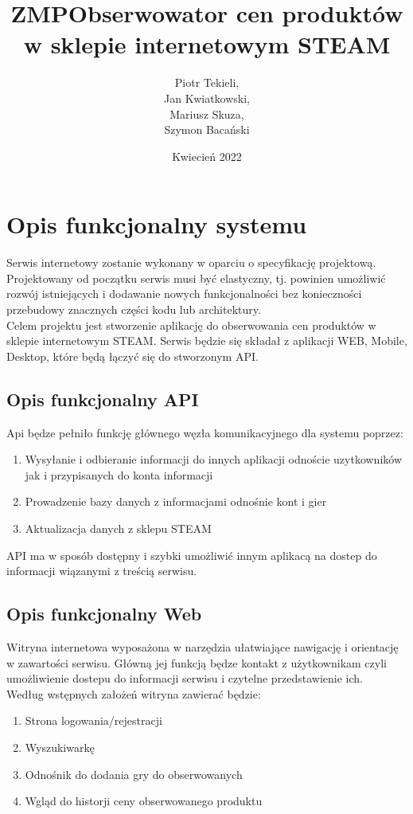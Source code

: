 \documentclass{article}
\title{ZMP\textunderscore Obserwowator cen produktów w sklepie  internetowym STEAM}
\author{
Piotr Tekieli,\\
Jan Kwiatkowski,\\
Mariusz Skuza,\\
Szymon Bacański
}
\date{Kwiecień 2022}
\begin{document}
\maketitle

\section{Opis funkcjonalny systemu}
Serwis internetowy zostanie wykonany w oparciu o specyfikację projektową. Projektowany od początku serwis musi być elastyczny, tj. powinien umożliwić rozwój istniejących i dodawanie nowych funkcjonalności bez konieczności przebudowy znacznych części kodu lub architektury.
\\
Celem projektu jest stworzenie aplikację do obserwowania cen produktów w sklepie internetowym STEAM. Serwis będzie się składał z aplikacji WEB, Mobile, Desktop, które będą łączyć się do stworzonym API.

    \subsection{Opis funkcjonalny API}
        Api będze pełniło funkcję głównego węzła komunikacyjnego dla systemu poprzez:
        \begin{enumerate}
            \item Wysyłanie i odbieranie informacji do innych aplikacji odnoście uzytkowników jak i przypisanych do konta informacji
            \item Prowadzenie bazy danych z informacjami odnośnie kont i gier
            \item Aktualizacja danych z sklepu STEAM 
        \end{enumerate}
        API ma w sposób dostępny i szybki umożliwić innym aplikacą na dostep do informacji wiązanymi z treścią serwisu. 
        
    \subsection{Opis funkcjonalny Web}
         Witryna internetowa wyposażona w narzędzia ułatwiające nawigację i orientację w zawartości serwisu. Główną jej funkcją będze kontakt z użytkownikam czyli umożliwienie dostepu do informacji
         serwisu i czytelne przedstawienie ich.
         \\
         Według wstępnych założeń witryna zawierać będzie:
        \begin{enumerate}
            \item Strona logowania/rejestracji
            \item Wyszukiwarkę
            \item Odnośnik do dodania gry do obserwowanych
            \item Wgląd do historji ceny obserwowanego produktu
        \end{enumerate}
        
\end{document}
